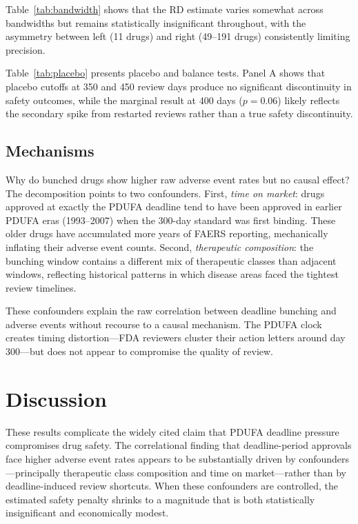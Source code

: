 \documentclass[12pt]{article}
\begin{document}
Table~\ref{tab:bandwidth} shows that the RD estimate varies somewhat across bandwidths but remains statistically insignificant throughout, with the asymmetry between left (11 drugs) and right (49--191 drugs) consistently limiting precision.



Table~\ref{tab:placebo} presents placebo and balance tests. Panel A shows that placebo cutoffs at 350 and 450 review days produce no significant discontinuity in safety outcomes, while the marginal result at 400 days ($p = 0.06$) likely reflects the secondary spike from restarted reviews rather than a true safety discontinuity.

\subsection{Mechanisms}

Why do bunched drugs show higher raw adverse event rates but no causal effect? The decomposition points to two confounders. First, \textit{time on market}: drugs approved at exactly the PDUFA deadline tend to have been approved in earlier PDUFA eras (1993--2007) when the 300-day standard was first binding. These older drugs have accumulated more years of FAERS reporting, mechanically inflating their adverse event counts. Second, \textit{therapeutic composition}: the bunching window contains a different mix of therapeutic classes than adjacent windows, reflecting historical patterns in which disease areas faced the tightest review timelines.

These confounders explain the raw correlation between deadline bunching and adverse events without recourse to a causal mechanism. The PDUFA clock creates timing distortion---FDA reviewers cluster their action letters around day 300---but does not appear to compromise the quality of review.

\section{Discussion}

These results complicate the widely cited claim that PDUFA deadline pressure compromises drug safety. The correlational finding that deadline-period approvals face higher adverse event rates appears to be substantially driven by confounders---principally therapeutic class composition and time on market---rather than by deadline-induced review shortcuts. When these confounders are controlled, the estimated safety penalty shrinks to a magnitude that is both statistically insignificant and economically modest.
\end{document}

